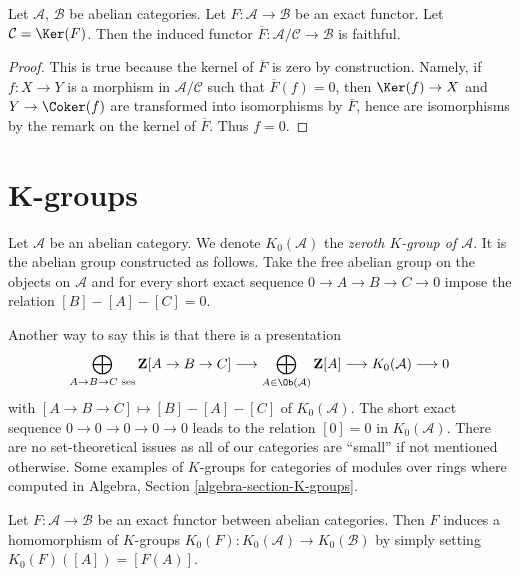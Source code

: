 \begin{lemma}
\label{lemma-quotient-by-kernel-exact-functor}
Let $\mathcal{A}$, $\mathcal{B}$ be abelian categories.
Let $F : \mathcal{A} \to \mathcal{B}$ be an exact functor.
Let $\mathcal{C} = \Ker(F)$. Then the induced functor
$\overline{F} : \mathcal{A}/\mathcal{C} \to \mathcal{B}$ is
faithful.
\end{lemma}

\begin{proof}
This is true because the kernel of $\overline{F}$ is zero by
construction. Namely, if $f : X \to Y$ is a morphism in
$\mathcal{A}/\mathcal{C}$ such that $\overline{F}(f) = 0$, then
$\Ker(f) \to X$ and $Y \to \Coker(f)$ are transformed
into isomorphisms by $\overline{F}$, hence are isomorphisms by the
remark on the kernel of $\overline{F}$. Thus $f = 0$.
\end{proof}






\section{K-groups}
\label{section-K-groups}

\begin{definition}
\label{definition-K-zero}
Let $\mathcal{A}$ be an abelian category.
We denote $K_0(\mathcal{A})$ the
{\it zeroth $K$-group of $\mathcal{A}$}.
It is the abelian group constructed as follows.
Take the free abelian group
on the objects on $\mathcal{A}$
and for every short exact sequence
$0 \to A \to B \to C \to 0$
impose the relation $[B] - [A] - [C] = 0$.
\end{definition}

\noindent
Another way to say this is that there is a presentation
$$
\bigoplus_{A \to B \to C\text{ ses}}
\mathbf{Z}[A \to B \to C]
\longrightarrow
\bigoplus_{A \in \Ob(\mathcal{A})}
\mathbf{Z}[A]
\longrightarrow
K_0(\mathcal{A})
\longrightarrow
0
$$
with $[A \to B \to C] \mapsto [B] - [A] - [C]$ of $K_0(\mathcal{A})$.
The short exact sequence $0 \to 0 \to 0 \to 0 \to 0$
leads to the relation $[0] = 0$ in $K_0(\mathcal{A})$.
There are no set-theoretical issues as all of our categories
are ``small'' if not mentioned otherwise.
Some examples of $K$-groups for categories of modules
over rings where computed in
Algebra, Section \ref{algebra-section-K-groups}.

\begin{lemma}
\label{lemma-exact-functor-K-groups}
Let $F : \mathcal{A} \to \mathcal{B}$ be an exact functor between
abelian categories. Then $F$ induces a homomorphism of $K$-groups
$K_0(F) : K_0(\mathcal{A}) \to K_0(\mathcal{B})$ by simply setting
$K_0(F)([A]) = [F(A)]$.
\end{lemma}

